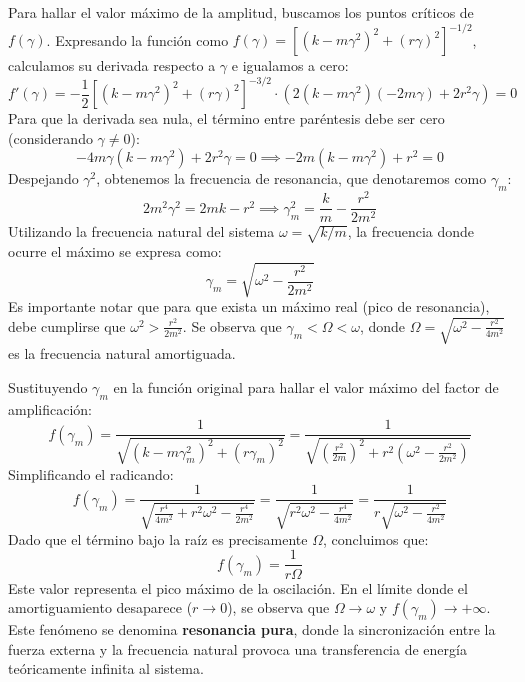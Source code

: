 Para hallar el valor máximo de la amplitud, buscamos los puntos críticos de $f(\gamma)$. Expresando la función como $f(\gamma) = [(k-m\gamma^2)^2 + (r \gamma)^2]^{-1/2}$, calculamos su derivada respecto a $\gamma$ e igualamos a cero:
\[ f'(\gamma) = -\frac{1}{2} [(k-m\gamma^2)^2 + (r \gamma)^2]^{-3/2} \cdot \left( 2(k-m\gamma^2)(-2m\gamma) + 2 r^2 \gamma \right) = 0 \]
Para que la derivada sea nula, el término entre paréntesis debe ser cero (considerando $\gamma \neq 0$):
\[ -4m\gamma(k - m \gamma^2) + 2 r^2 \gamma = 0 \implies -2m(k - m \gamma^2) + r^2 = 0 \]
Despejando $\gamma^2$, obtenemos la frecuencia de resonancia, que denotaremos como $\gamma_m$:
\[ 2m^2 \gamma^2 = 2mk - r^2 \implies \gamma_m^2 = \frac{k}{m} - \frac{r^2}{2m^2} \]
Utilizando la frecuencia natural del sistema $\omega = \sqrt{k/m}$, la frecuencia donde ocurre el máximo se expresa como:
\[ \gamma_m = \sqrt{\omega^2 - \frac{r^2}{2m^2}} \]
Es importante notar que para que exista un máximo real (pico de resonancia), debe cumplirse que $\omega^2 > \frac{r^2}{2m^2}$. Se observa que $\gamma_m < \Omega < \omega$, donde $\Omega = \sqrt{\omega^2 - \frac{r^2}{4m^2}}$ es la frecuencia natural amortiguada.

Sustituyendo $\gamma_m$ en la función original para hallar el valor máximo del factor de amplificación:
\[ f(\gamma_m) = \frac{1}{\sqrt{(k - m \gamma_m^2)^2 + (r \gamma_m)^2}} = \frac{1}{\sqrt{\left(\frac{r^2}{2m}\right)^2 + r^2 \left(\omega^2 - \frac{r^2}{2m^2}\right)}} \]
Simplificando el radicando:
\[ f(\gamma_m) = \frac{1}{\sqrt{\frac{r^4}{4m^2} + r^2 \omega^2 - \frac{r^4}{2m^2}}} = \frac{1}{\sqrt{r^2 \omega^2 - \frac{r^4}{4m^2}}} = \frac{1}{r \sqrt{\omega^2 - \frac{r^2}{4m^2}}} \]
Dado que el término bajo la raíz es precisamente $\Omega$, concluimos que:
\[ f(\gamma_m) = \frac{1}{r \Omega} \]
Este valor representa el pico máximo de la oscilación. En el límite donde el amortiguamiento desaparece ($r \to 0$), se observa que $\Omega \to \omega$ y $f(\gamma_m) \to +\infty$. Este fenómeno se denomina \textbf{resonancia pura}, donde la sincronización entre la fuerza externa y la frecuencia natural provoca una transferencia de energía teóricamente infinita al sistema.
